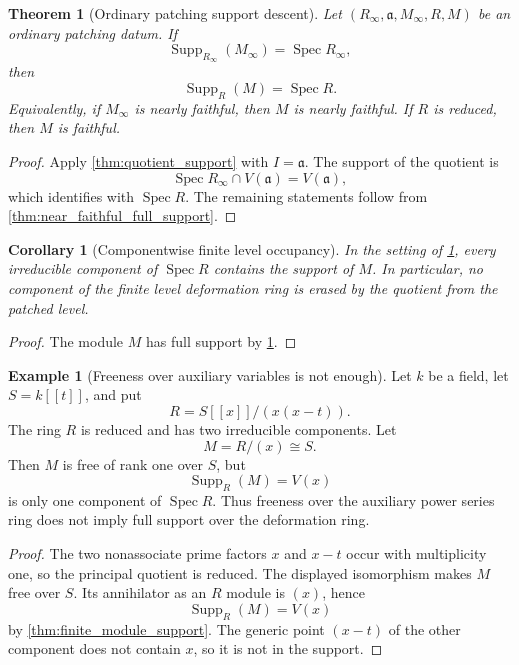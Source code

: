 \documentclass{aomart}
\newtheorem{theorem}{Theorem}[section]
\newtheorem{corollary}[corollary]{Corollary}
\theoremstyle{definition}
\newtheorem{example}[example]{Example}
\theoremstyle{remark}
\newcommand{\Spec}{\operatorname{Spec}}
\newcommand{\Supp}{\operatorname{Supp}}
\newcommand{\fraka}{\mathfrak a}
\begin{document}
\begin{theorem}[Ordinary patching support descent]\label{thm:ordinary_support_descent}
Let \((R_\infty,\fraka,M_\infty,R,M)\) be an ordinary patching datum. If
\[
\Supp_{R_\infty}(M_\infty)=\Spec R_\infty,
\]
then
\[
\boxed{
\Supp_R(M)=\Spec R.
}
\]
Equivalently, if \(M_\infty\) is nearly faithful, then \(M\) is nearly faithful. If \(R\) is reduced, then \(M\) is faithful.
\end{theorem}

\begin{proof}
Apply \cref{thm:quotient_support} with \(I=\fraka\). The support of the quotient is
\[
\Spec R_\infty\cap V(\fraka)=V(\fraka),
\]
which identifies with \(\Spec R\). The remaining statements follow from
\cref{thm:near_faithful_full_support}.
\end{proof}

\begin{corollary}[Componentwise finite level occupancy]\label{cor:componentwise_occupancy}
In the setting of \cref{thm:ordinary_support_descent}, every irreducible component of
\(\Spec R\) contains the support of \(M\). In particular, no component of the finite level deformation ring is erased by the quotient from the patched level.
\end{corollary}

\begin{proof}
The module \(M\) has full support by \cref{thm:ordinary_support_descent}.
\end{proof}

\begin{example}[Freeness over auxiliary variables is not enough]\label{ex:freeness_not_support}
Let \(k\) be a field, let \(S=k[[t]]\), and put
\[
R=S[[x]]/(x(x-t)).
\]
The ring \(R\) is reduced and has two irreducible components. Let
\[
M=R/(x)\cong S.
\]
Then \(M\) is free of rank one over \(S\), but
\[
\Supp_R(M)=V(x)
\]
is only one component of \(\Spec R\). Thus freeness over the auxiliary power series ring does not imply full support over the deformation ring.
\end{example}

\begin{proof}
The two nonassociate prime factors \(x\) and \(x-t\) occur with multiplicity one, so the principal quotient is reduced. The displayed isomorphism makes \(M\) free over \(S\). Its annihilator as an \(R\) module is \((x)\), hence
\[
\Supp_R(M)=V(x)
\]
by \cref{thm:finite_module_support}. The generic point \((x-t)\) of the other component does not contain \(x\), so it is not in the support.
\end{proof}
\end{document}
